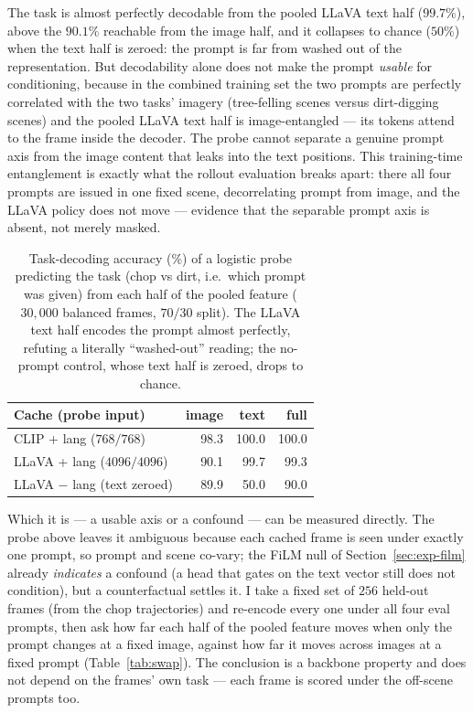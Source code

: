 The task is almost perfectly decodable from the pooled LLaVA text half ($99.7\%$),
above the $90.1\%$ reachable from the image half, and it collapses to chance
($50\%$) when the text half is zeroed: the prompt is far from washed out of the
representation. But decodability alone does not make the prompt \emph{usable} for
conditioning, because in the combined training set the two prompts are perfectly
correlated with the two tasks' imagery (tree-felling scenes versus dirt-digging
scenes) and the pooled LLaVA text half is image-entangled --- its tokens attend
to the frame inside the decoder. The probe cannot separate a genuine prompt axis
from the image content that leaks into the text positions. This training-time
entanglement is exactly what the rollout evaluation breaks apart: there all four
prompts are issued in one fixed scene, decorrelating prompt from image, and the
LLaVA policy does not move --- evidence that the separable prompt axis is absent,
not merely masked.

\begin{table}[ht]
\centering
\begin{tabular}{lrrr}
\hline
Cache (probe input) & image & text & full \\
\hline
CLIP + lang ($768/768$)        & 98.3 & 100.0 & 100.0 \\
LLaVA + lang ($4096/4096$)     & 90.1 & 99.7  & 99.3 \\
LLaVA $-$ lang (text zeroed)   & 89.9 & 50.0  & 90.0 \\
\hline
\end{tabular}
\caption{Task-decoding accuracy (\%) of a logistic probe predicting the task
(chop vs dirt, i.e.\ which prompt was given) from each half of the pooled feature
($30{,}000$ balanced frames, $70/30$ split). The LLaVA text half encodes the
prompt almost perfectly, refuting a literally \enquote{washed-out} reading; the
no-prompt control, whose text half is zeroed, drops to chance.}
\label{tab:probe}
\end{table}

Which it is --- a usable axis or a confound --- can be measured directly. The
probe above leaves it ambiguous because each cached frame is seen under exactly
one prompt, so prompt and scene co-vary; the FiLM null of
Section~\ref{sec:exp-film} already \emph{indicates} a confound (a head that gates
on the text vector still does not condition), but a counterfactual settles it. I
take a fixed set of $256$ held-out frames (from the chop trajectories) and
re-encode every one under all four eval prompts, then ask how far each half of the
pooled feature moves when only the prompt changes at a fixed image, against how
far it moves across images at a fixed prompt (Table~\ref{tab:swap}). The
conclusion is a backbone property and does not depend on the frames' own task ---
each frame is scored under the off-scene prompts too.

